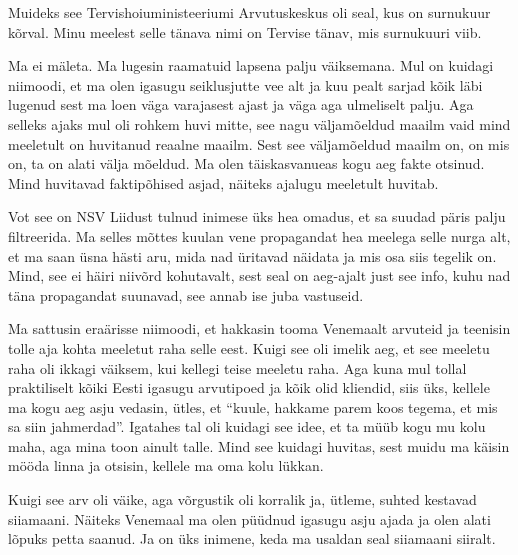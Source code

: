 Muideks see Tervishoiuministeeriumi Arvutuskeskus oli seal, kus on surnukuur kõrval. Minu meelest selle tänava nimi on Tervise tänav, mis surnukuuri viib. 


Ma ei mäleta. Ma lugesin raamatuid lapsena palju väiksemana. Mul on kuidagi niimoodi, et ma olen igasugu seiklusjutte vee alt ja kuu pealt sarjad kõik läbi lugenud sest ma loen väga varajasest ajast ja väga aga ulmeliselt palju. Aga selleks ajaks mul oli rohkem huvi mitte, see nagu väljamõeldud maailm vaid mind meeletult on huvitanud reaalne maailm. Sest see väljamõeldud maailm on, on mis on, ta on alati välja mõeldud. Ma olen täiskasvanueas kogu aeg fakte otsinud. Mind huvitavad faktipõhised asjad, näiteks ajalugu meeletult huvitab. 


Vot see on NSV Liidust tulnud inimese üks hea omadus, et sa suudad päris palju filtreerida. Ma selles mõttes kuulan vene propagandat hea meelega selle nurga alt, et ma saan üsna hästi aru, mida nad üritavad näidata ja mis osa siis  tegelik on. Mind, see ei häiri niivõrd kohutavalt, sest seal on aeg-ajalt just see info, kuhu nad täna propagandat suunavad, see annab ise juba vastuseid. 


Ma sattusin eraärisse niimoodi, et  hakkasin tooma Venemaalt arvuteid ja teenisin tolle aja kohta meeletut raha selle eest. Kuigi see oli imelik aeg, et see meeletu raha oli ikkagi väiksem, kui kellegi teise meeletu raha. Aga kuna mul  tollal praktiliselt kõiki Eesti igasugu arvutipoed ja kõik olid kliendid, siis  üks, kellele ma kogu aeg asju vedasin, ütles, et \enquote{kuule,  hakkame parem koos tegema, et mis sa siin jahmerdad}. Igatahes tal oli kuidagi see idee, et ta müüb kogu mu kolu maha, aga mina toon ainult talle. Mind see kuidagi huvitas, sest muidu ma käisin mööda linna ja otsisin, kellele ma oma kolu lükkan. 


Kuigi see arv oli väike, aga võrgustik oli korralik ja, ütleme, suhted kestavad siiamaani. Näiteks Venemaal ma olen püüdnud igasugu asju ajada ja olen alati lõpuks petta saanud. Ja  on üks inimene, keda ma usaldan seal siiamaani siiralt. 

